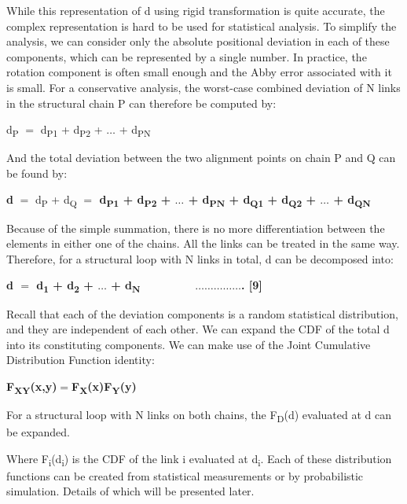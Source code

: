 While this representation of d using rigid transformation is quite accurate, the complex representation is hard to be used for statistical analysis. To simplify the analysis, we can consider only the absolute positional deviation in each of these components, which can be represented by a single number. In practice, the rotation component is often small enough and the Abby error associated with it is small. For a conservative analysis, the worst-case combined deviation of N links in the structural chain P can therefore be computed by:

d\textsubscript{P} $=$ d\textsubscript{P1} + d\textsubscript{P2} + $\ldots$ + d\textsubscript{PN} 

And the total deviation between the two alignment points on chain P and Q can be found by:

\textbf{d }$=$ d\textsubscript{P} + d\textsubscript{Q} \textbf{$=$ d\textsubscript{P1} + d\textsubscript{P2} + $\ldots$ + d\textsubscript{PN} + d\textsubscript{Q1} + d\textsubscript{Q2} + $\ldots$ + d\textsubscript{QN} }

Because of the simple summation, there is no more differentiation between the elements in either one of the chains. All the links can be treated in the same way. Therefore, for a structural loop with N links in total, d can be decomposed into:

\textbf{d $=$ d\textsubscript{1} + d\textsubscript{2} + $\ldots$ + d\textsubscript{N} \ \ \ \ \ \ \ \ $\ldots$$\ldots$$\ldots$$\ldots$$\ldots$. [9] }

Recall that each of the deviation components is a random statistical distribution, and they are independent of each other. We can expand the CDF of the total d into its constituting components. We can make use of the Joint Cumulative Distribution Function identity:

\textbf{F\textsubscript{XY}(x,y)$=$F\textsubscript{X}(x)F\textsubscript{Y}(y)}

For a structural loop with N links on both chains, the F\textsubscript{D}(d) evaluated at d can be expanded. 


Where F\textsubscript{i}(d\textsubscript{i}) is the CDF of the link i evaluated at d\textsubscript{i}. Each of these distribution functions can be created from statistical measurements or by probabilistic simulation. Details of which will be presented later.

